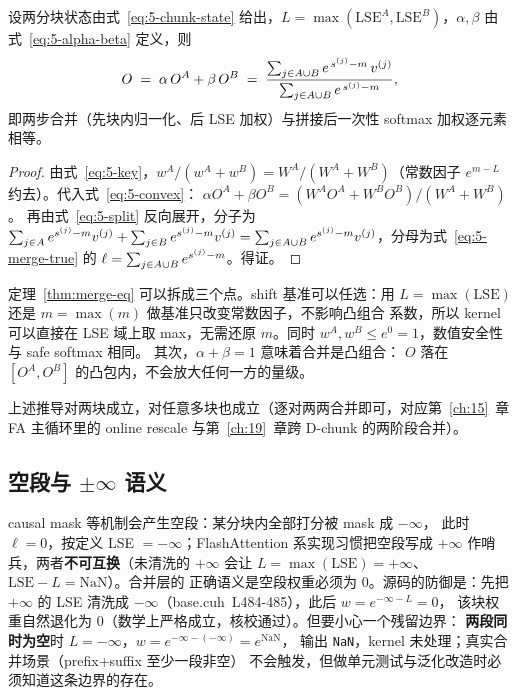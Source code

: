 \begin{theorem}\label{thm:merge-eq}
  设两分块状态由式~\ref{eq:5-chunk-state} 给出，$L = \max(\mathrm{LSE}^{A},
  \mathrm{LSE}^{B})$，$\alpha, \beta$ 由式~\ref{eq:5-alpha-beta} 定义，则
  \begin{equation}
    O \;=\; \alpha\, O^{A} + \beta\, O^{B}
      \;=\; \frac{\sum\sb{j \in A \cup B} e^{\,s^{(j)} - m}\, v^{(j)}}
                 {\sum\sb{j \in A \cup B} e^{\,s^{(j)} - m}} ,
    \label{eq:5-theorem}
  \end{equation}
  即两步合并（先块内归一化、后 LSE 加权）与拼接后一次性 softmax 加权逐元素相等。
\end{theorem}
\begin{proof}
  由式~\ref{eq:5-key}，$w^{A}/(w^{A}+w^{B}) = W^{A}/(W^{A}+W^{B})$（常数因子
  $e^{m-L}$ 约去）。代入式~\ref{eq:5-convex}：
  $\alpha O^{A} + \beta O^{B} = (W^{A} O^{A} + W^{B} O^{B})/(W^{A}+W^{B})$。
  再由式~\ref{eq:5-split} 反向展开，分子为
  $\sum\sb{j \in A} e^{s^{(j)}-m} v^{(j)} + \sum\sb{j \in B} e^{s^{(j)}-m} v^{(j)}
  = \sum\sb{j \in A \cup B} e^{s^{(j)}-m} v^{(j)}$，分母为式~\ref{eq:5-merge-true}
  的 $\ell = \sum\sb{j \in A \cup B} e^{s^{(j)}-m}$。得证。
\end{proof}

定理~\ref{thm:merge-eq} 可以拆成三个点。shift 基准可以任选：用
$L = \max(\mathrm{LSE})$ 还是 $m = \max(m)$ 做基准只改变常数因子，不影响凸组合
系数，所以 kernel 可以直接在 LSE 域上取 max，无需还原 $m$。同时
$w^{A}, w^{B} \le e^{0} = 1$，数值安全性与 safe softmax 相同。
其次，$\alpha + \beta = 1$ 意味着合并是凸组合：
$O$ 落在 $[O^{A}, O^{B}]$ 的凸包内，不会放大任何一方的量级。

上述推导对两块成立，对任意多块也成立（逐对两两合并即可，对应第~\ref{ch:15}~章
FA 主循环里的 online rescale 与第~\ref{ch:19}~章跨 D-chunk 的两阶段合并）。

\subsection{空段与 $\pm\infty$ 语义}

causal mask 等机制会产生空段：某分块内全部打分被 mask 成 $-\infty$，
此时 $\ell = 0$，按定义 LSE $= -\infty$；FlashAttention 系实现习惯把空段写成
$+\infty$ 作哨兵，两者\textbf{不可互换}（未清洗的 $+\infty$ 会让
$L=\max(\mathrm{LSE})=+\infty$、$\mathrm{LSE}-L=\mathrm{NaN}$）。合并层的
正确语义是空段权重必须为 0。源码的防御是：先把 $+\infty$ 的 LSE
清洗成 $-\infty$（base.cuh~L484-485），此后 $w = e^{-\infty - L} = 0$，
该块权重自然退化为 0（数学上严格成立，核校通过）。但要小心一个残留边界：
\textbf{两段同时为空}时 $L = -\infty$，$w = e^{-\infty - (-\infty)} = e^{\mathrm{NaN}}$，
输出 \texttt{NaN}，kernel 未处理；真实合并场景（prefix+suffix 至少一段非空）
不会触发，但做单元测试与泛化改造时必须知道这条边界的存在。

